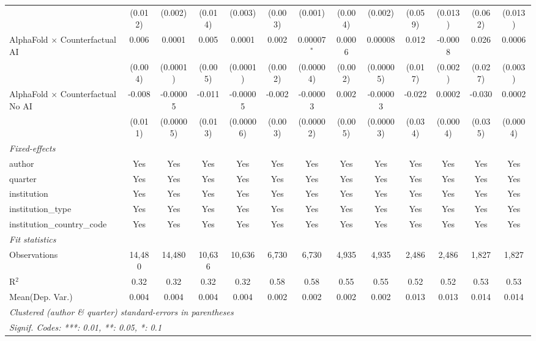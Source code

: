 \begin{tabular}{lcccccccccccc}
                                            & (0.012)      & (0.002)   & (0.014) & (0.003)   & (0.003) & (0.001)       & (0.004) & (0.002)   & (0.059) & (0.013)  & (0.062) & (0.013)\\   
   AlphaFold $\times$ Counterfactual AI     & 0.006        & 0.0001    & 0.005   & 0.0001    & 0.002   & 0.00007$^{*}$ & 0.0006  & 0.00008   & 0.012   & -0.0008  & 0.026   & 0.0006\\   
                                            & (0.004)      & (0.0001)  & (0.005) & (0.0001)  & (0.002) & (0.00004)     & (0.002) & (0.00005) & (0.017) & (0.002)  & (0.027) & (0.003)\\   
   AlphaFold $\times$ Counterfactual No AI  & -0.008       & -0.00005  & -0.011  & -0.00005  & -0.002  & -0.00003      & 0.002   & -0.00003  & -0.022  & 0.0002   & -0.030  & 0.0002\\   
                                            & (0.011)      & (0.00005) & (0.013) & (0.00006) & (0.003) & (0.00002)     & (0.005) & (0.00003) & (0.034) & (0.0004) & (0.035) & (0.0004)\\   
   \midrule
   \emph{Fixed-effects}\\
   author                                   & Yes          & Yes       & Yes     & Yes       & Yes     & Yes           & Yes     & Yes       & Yes     & Yes      & Yes     & Yes\\  
   quarter                                  & Yes          & Yes       & Yes     & Yes       & Yes     & Yes           & Yes     & Yes       & Yes     & Yes      & Yes     & Yes\\  
   institution                              & Yes          & Yes       & Yes     & Yes       & Yes     & Yes           & Yes     & Yes       & Yes     & Yes      & Yes     & Yes\\  
   institution\_type                        & Yes          & Yes       & Yes     & Yes       & Yes     & Yes           & Yes     & Yes       & Yes     & Yes      & Yes     & Yes\\  
   institution\_country\_code               & Yes          & Yes       & Yes     & Yes       & Yes     & Yes           & Yes     & Yes       & Yes     & Yes      & Yes     & Yes\\  
   \midrule
   \emph{Fit statistics}\\
   Observations                             & 14,480       & 14,480    & 10,636  & 10,636    & 6,730   & 6,730         & 4,935   & 4,935     & 2,486   & 2,486    & 1,827   & 1,827\\  
   R$^2$                                    & 0.32         & 0.32      & 0.32    & 0.32      & 0.58    & 0.58          & 0.55    & 0.55      & 0.52    & 0.52     & 0.53    & 0.53\\  
Mean(Dep. Var.) & 0.004 & 0.004 & 0.004 & 0.004 & 0.002 & 0.002 & 0.002 & 0.002 & 0.013 & 0.013 & 0.014 & 0.014 \\
   \midrule \midrule
   \multicolumn{13}{l}{\emph{Clustered (author \& quarter) standard-errors in parentheses}}\\
   \multicolumn{13}{l}{\emph{Signif. Codes: ***: 0.01, **: 0.05, *: 0.1}}\\
\end{tabular}
\par\endgroup
